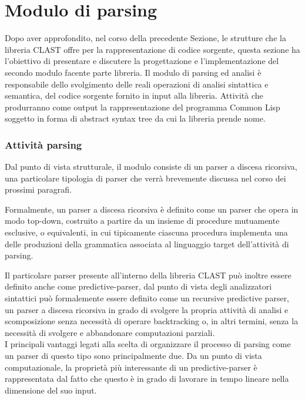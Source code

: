\section{Modulo di parsing}
\label{parsing}

Dopo aver approfondito, nel corso della precedente Sezione, le strutture che la
libreria CLAST offre per la rappresentazione di codice sorgente, questa sezione
ha l’obiettivo di presentare e discutere la progettazione e l'implementazione
del secondo modulo facente parte libreria. Il modulo di parsing ed analisi è
responsabile dello svolgimento delle reali operazioni di analisi sintattica e
semantica, del codice sorgente fornito in input alla libreria. Attività che
produrranno come output la rappresentazione del programma Common Lisp soggetto
in forma di abstract syntax tree da cui la libreria prende nome.\\

\subsubsection{Attività parsing}

Dal punto di vista strutturale, il modulo consiste di un parser a discesa
ricorsiva, una particolare tipologia di parser che verrà brevemente discussa nel
corso dei prossimi paragrafi.

Formalmente, un parser a discesa ricorsiva è definito come un parser che opera
in modo top-down, costruito a partire da un insieme di procedure mutuamente
esclusive, o equivalenti, in cui tipicamente ciascuna procedura implementa una
delle produzioni della grammatica associata al linguaggio target dell’attività
di parsing.

Il particolare parser presente all’interno della libreria CLAST può inoltre
essere definito anche come predictive-parser, dal punto di vista degli
analizzatori sintattici può formalemente essere definito come un recursive
predictive parser, un parser a discesa ricorsiva in grado di svolgere la propria
attività di analisi e scomposizione senza necessità di operare backtracking o,
in altri termini, senza la necessità di svolgere e abbandonare computazioni
parziali.\\

I principali vantaggi legati alla scelta di organizzare il processo di parsing
come un parser di questo tipo sono principalmente due. Da un punto di vista
computazionale, la proprietà più interessante di un predictive-parser è
rappresentata dal fatto che questo è in grado di lavorare in tempo lineare nella
dimensione del suo input.


